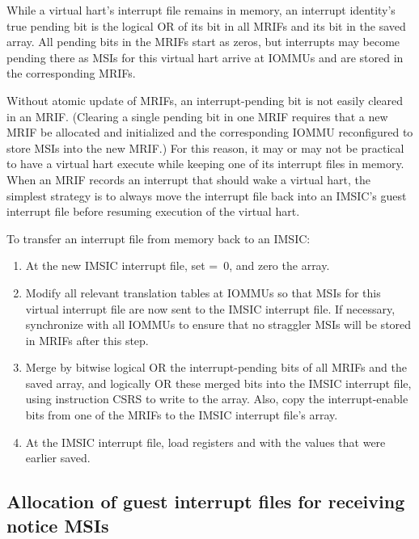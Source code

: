 While a virtual hart's interrupt file remains in memory, an interrupt
identity's true pending bit is the logical OR of its bit in all MRIFs
and its bit in the saved  array.
All pending bits in the MRIFs start as zeros, but interrupts may become
pending there as MSIs for this virtual hart arrive at \mbox{IOMMU}s and are
stored in the corresponding MRIFs.

Without atomic update of MRIFs, an interrupt-pending bit is not easily
cleared in an MRIF.
(Clearing a single pending bit in one MRIF requires that a new MRIF be
allocated and initialized and the corresponding \mbox{IOMMU} reconfigured to
store MSIs into the new MRIF.)
For this reason, it may or may not be practical to have a virtual hart
execute while keeping one of its interrupt files in memory.
When an MRIF records an interrupt that should wake a virtual hart, the
simplest strategy is to always move the interrupt file back into an
IMSIC's guest interrupt file before resuming execution of the virtual
hart.

To transfer an interrupt file from memory back to an IMSIC:
\begin{enumerate}

\item
At the new IMSIC interrupt file, set  =~0, and zero the
 array.

\item
Modify all relevant translation tables at \mbox{IOMMU}s so that MSIs for
this virtual interrupt file are now sent to the IMSIC interrupt file.
If necessary, synchronize with all \mbox{IOMMU}s to ensure that no straggler
MSIs will be stored in MRIFs after this step.

\item
Merge by bitwise logical OR the interrupt-pending bits of all MRIFs and
the saved  array, and logically OR these merged bits into the
IMSIC interrupt file, using instruction CSRS to write to the 
array.
Also, copy the interrupt-enable bits from one of the MRIFs to the IMSIC
interrupt file's  array.

\item
At the IMSIC interrupt file, load registers  and
 with the values that were earlier saved.

\end{enumerate}

\subsection{Allocation of guest interrupt files for receiving notice MSIs}


